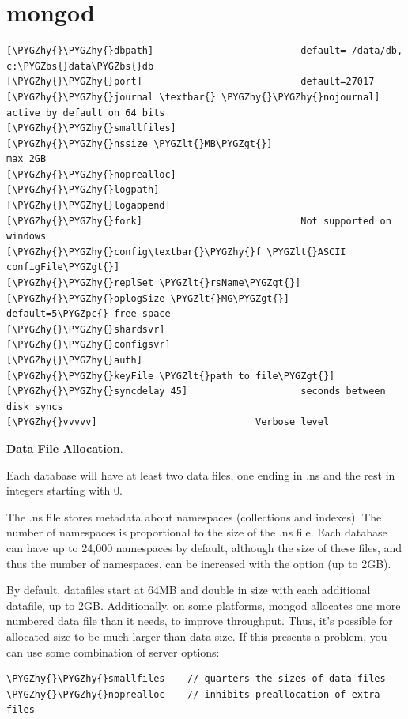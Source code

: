 \documentclass[a4paper,10pt,english]{sphinxmanual}
\def\PYGZbs{\char`\\}
\def\PYGZlt{\char`\<}
\def\PYGZgt{\char`\>}
\def\PYGZpc{\char`\%}
\def\PYGZhy{\char`\-}
\begin{document}
\section{mongod}
\label{contents/comandos:mongod}
\begin{Verbatim}[commandchars=\\\{\}]
[\PYGZhy{}\PYGZhy{}dbpath]                          default= /data/db, c:\PYGZbs{}data\PYGZbs{}db
[\PYGZhy{}\PYGZhy{}port]                            default=27017
[\PYGZhy{}\PYGZhy{}journal \textbar{} \PYGZhy{}\PYGZhy{}nojournal]           active by default on 64 bits
[\PYGZhy{}\PYGZhy{}smallfiles]
[\PYGZhy{}\PYGZhy{}nssize \PYGZlt{}MB\PYGZgt{}]                     max 2GB
[\PYGZhy{}\PYGZhy{}noprealloc]
[\PYGZhy{}\PYGZhy{}logpath]
[\PYGZhy{}\PYGZhy{}logappend]
[\PYGZhy{}\PYGZhy{}fork]                            Not supported on windows
[\PYGZhy{}\PYGZhy{}config\textbar{}\PYGZhy{}f \PYGZlt{}ASCII configFile\PYGZgt{}]
[\PYGZhy{}\PYGZhy{}replSet \PYGZlt{}rsName\PYGZgt{}]
[\PYGZhy{}\PYGZhy{}oplogSize \PYGZlt{}MG\PYGZgt{}]                  default=5\PYGZpc{} free space
[\PYGZhy{}\PYGZhy{}shardsvr]
[\PYGZhy{}\PYGZhy{}configsvr]
[\PYGZhy{}\PYGZhy{}auth]
[\PYGZhy{}\PYGZhy{}keyFile \PYGZlt{}path to file\PYGZgt{}]
[\PYGZhy{}\PYGZhy{}syncdelay 45]                    seconds between disk syncs
[\PYGZhy{}vvvvv]                            Verbose level
\end{Verbatim}

\textbf{Data File Allocation}.

Each database will have at least two data files, one ending in .ns and the rest in integers starting with 0.

The .ns file stores metadata about namespaces (collections and indexes). The number of namespaces is
proportional to the size of the .ns file. Each database can have up to 24,000 namespaces by default, although
the size of these files, and thus the number of namespaces, can be increased with the  option (up
to 2GB).

By default, datafiles start at 64MB and double in size with each additional datafile, up to 2GB. Additionally,
on some platforms, mongod allocates one more numbered data file than it needs, to improve throughput.
Thus, it’s possible for allocated size to be much larger than data size. If this presents a problem, you can
use some combination of server options:

\begin{Verbatim}[commandchars=\\\{\}]
\PYGZhy{}\PYGZhy{}smallfiles    // quarters the sizes of data files
\PYGZhy{}\PYGZhy{}noprealloc    // inhibits preallocation of extra files
\end{Verbatim}
\end{document}
